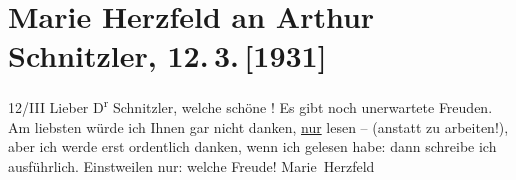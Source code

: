 

               \section[Marie Herzfeld an Arthur Schnitzler, 12. 3. {[}1931{]}]{ Marie Herzfeld an Arthur Schnitzler, 12. 3. {[}1931{]}}\nopagebreak{}\rehead{ }\begin{ledgroupsized}[t]{13cm}\normalsize\beginnumbering{} \toendnotes[C]{\smallbreak\pagebreak[2]} 
\toendnotes[C]{\smallbreak}\pstart
           \centering{}{\pb}12/III\pend
           \pstart
           Lieber D\textsuperscript{r} Schnitzler, welche schöne
                  \label{K_L02596-1v}\label{K_L02596-1h}! Es gibt noch
               unerwartete Freuden. Am liebsten würde ich Ihnen gar nicht danken, \uline{nur} lesen – (anstatt zu arbeiten!), aber ich werde
               erst {\pb}ordentlich danken, wenn ich gelesen habe: dann
               schreibe ich ausführlich. Einstweilen nur: welche Freude! \pend
           \pstart \spacefill\mbox{Marie Herzfeld}\pend{}          \endnumbering{}\end{ledgroupsized}  \newcommand{\dateiname}{L02596}\newcommand{\titel}{Marie Herzfeld an Arthur Schnitzler, 12. 3. [1931]}\newcommand{\editorInnen}{Martin Anton Müller und Laura Untner}
            \footnotesize
\begin{ledgroupsized}[t]{11.5cm}
\end{ledgroupsized}
         
      